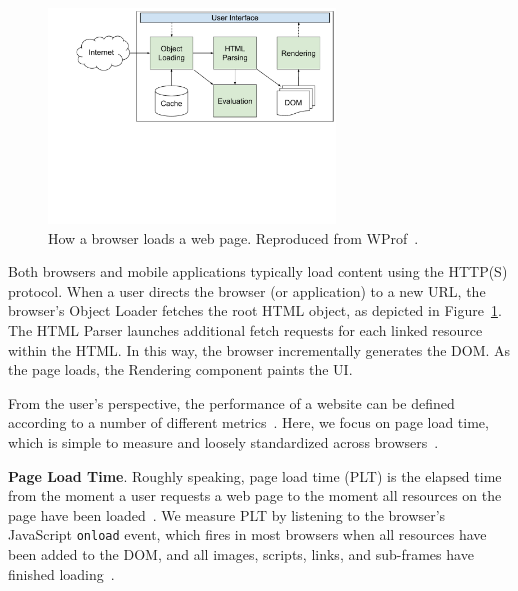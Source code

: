 \begin{figure}[t]
    \hspace{-10pt}
    \includegraphics[width=3in]{../images/network-diagram.pdf}
    \caption[]{\label{fig:network-diagram}How a browser loads a web page. Reproduced from WProf~\cite{wang2013demystifying}.}
\end{figure}
Both browsers and mobile applications typically load content using the HTTP(S) protocol. When a user directs the browser (or application) to a new URL, the browser's Object Loader fetches the root HTML object, as depicted
in Figure~\ref{fig:network-diagram}. The HTML Parser launches additional
fetch requests for each linked resource within the HTML. In this way, the browser incrementally generates the DOM.
As the page loads, the Rendering component paints the UI.

From the user's perspective, the performance of a website can be defined according to a number of different metrics~\cite{above-the-fold,speed-index}. Here,
we focus on page load time, which is simple to measure
and loosely standardized across browsers~\cite{w3c-onload}.

\textbf{Page Load Time}. Roughly speaking, page load time (PLT) is the elapsed time from the moment a user requests a web page to the moment all resources on the page have been loaded~\cite{page-speed}.
We measure PLT by listening to the browser's JavaScript \texttt{onload} event,
which fires in most browsers when all resources have been added to the DOM, and all images,
scripts, links, and sub-frames have finished loading~\cite{w3c-onload}.


